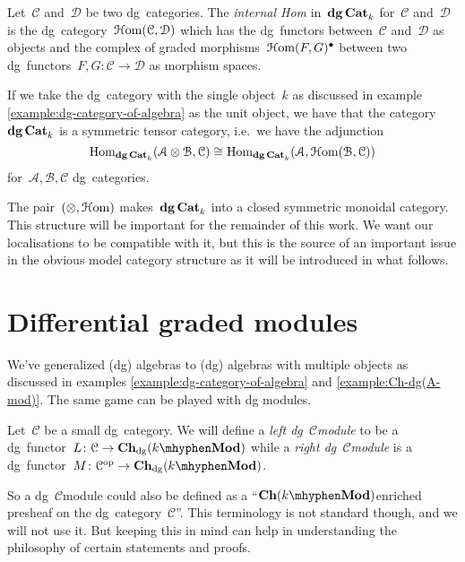 \begin{definition}
  \label{definition:internal-Hom-dgCat}
  Let~$\mathcal{C}$ and~$\mathcal{D}$ be two dg~categories. The \emph{internal Hom} in~$\mathbf{dg\,Cat}_k$ for~$\mathcal{C}$ and~$\mathcal{D}$ is the dg~category~$\operatorname{\mathcal{H}om}(\mathcal{C},\mathcal{D})$ which has the dg~functors between~$\mathcal{C}$ and~$\mathcal{D}$ as objects and the complex of graded morphisms~$\operatorname{\mathcal{H}om}(F,G)^\bullet$ between two dg~functors~$F,G\colon\mathcal{C}\to\mathcal{D}$ as morphism spaces.
\end{definition}
If we take the dg~category with the single object~$k$ as discussed in example \ref{example:dg-category-of-algebra} as the unit object, we have that the category~$\mathbf{dg\,Cat}_k$ is a symmetric tensor category, i.e.\ we have the adjunction
\begin{equation}
  \mathrm{Hom}_{\mathbf{dg\,Cat}_k}(\mathcal{A}\otimes\mathcal{B},\mathcal{C})\cong\mathrm{Hom}_{\mathbf{dg\,Cat}_k}(\mathcal{A},\operatorname{\mathcal{H}om}(\mathcal{B},\mathcal{C}))
  \label{equation:tensor-Hom-Chk-adjunction}
\end{equation}
for~$\mathcal{A},\mathcal{B},\mathcal{C}$ dg~categories.

The pair~$(\otimes,\operatorname{\mathcal{H}om})$ makes~$\mathbf{dg\,Cat}_k$ into a closed symmetric monoidal category. This structure will be important for the remainder of this work. We want our localisations to be compatible with it, but this is the source of an important issue in the obvious model category structure as it will be introduced in what follows.


\section{Differential graded modules}
We've generalized (dg) algebras to (dg) algebras with multiple objects as discussed in examples \ref{example:dg-category-of-algebra} and \ref{example:Ch-dg(A-mod)}. The same game can be played with dg modules.

\begin{definition}
  Let~$\mathcal{C}$ be a small dg~category. We will define a \emph{left dg~$\mathcal{C}$\dash module} to be a dg~functor~$L\colon\mathcal{C}\to\Ch_\dg(k\mhyphen\Mod)$ while a \emph{right dg~$\mathcal{C}$\dash module} is a dg~functor~$M\colon\mathcal{C}^\opp\to\Ch_\dg(k\mhyphen\Mod)$.
\end{definition}
So a dg~$\mathcal{C}$\dash module could also be defined as a ``$\Ch(k\mhyphen\Mod)$\dash enriched presheaf on the dg~category~$\mathcal{C}$''. This terminology is not standard though, and we will not use it. But keeping this in mind can help in understanding the philosophy of certain statements and proofs.

